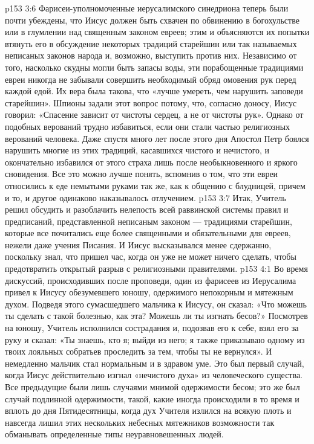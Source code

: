 \vs p153 3:6 Фарисеи\hyp{}уполномоченные иерусалимского синедриона теперь были почти убеждены, что Иисус должен быть схвачен по обвинению в богохульстве или в глумлении над священным законом евреев; этим и объясняются их попытки втянуть его в обсуждение некоторых традиций старейшин или так называемых неписаных законов народа и, возможно, выступить против них. Независимо от того, насколько скудны могли быть запасы воды, эти порабощенные традициями евреи никогда не забывали совершить необходимый обряд омовения рук перед каждой едой. Их вера была такова, что «лучше умереть, чем нарушить заповеди старейшин». Шпионы задали этот вопрос потому, что, согласно доносу, Иисус говорил: «Спасение зависит от чистоты сердец, а не от чистоты рук». Однако от подобных верований трудно избавиться, если они стали частью религиозных верований человека. Даже спустя много лет после этого дня Апостол Петр боялся нарушить многие из этих традиций, касавшихся чистого и нечистого, и окончательно избавился от этого страха лишь после необыкновенного и яркого сновидения. Все это можно лучше понять, вспомнив о том, что эти евреи относились к еде немытыми руками так же, как к общению с блудницей, причем и то, и другое одинаково наказывалось отлучением.
\vs p153 3:7 Итак, Учитель решил обсудить и разоблачить нелепость всей раввинской системы правил и предписаний, представленной неписаным законом --- традициями старейшин, которые все почитались еще более священными и обязательными для евреев, нежели даже учения Писания. И Иисус высказывался менее сдержанно, поскольку знал, что пришел час, когда он уже не может ничего сделать, чтобы предотвратить открытый разрыв с религиозными правителями.
\vs p153 4:1 Во время дискуссий, происходивших после проповеди, один из фарисеев из Иерусалима привел к Иисусу обезумевшего юношу, одержимого непокорным и мятежным духом. Подведя этого сумасшедшего мальчика к Иисусу, он сказал: «Что можешь ты сделать с такой болезнью, как эта? Можешь ли ты изгнать бесов?» Посмотрев на юношу, Учитель исполнился сострадания и, подозвав его к себе, взял его за руку и сказал: «Ты знаешь, кто я; выйди из него; я также приказываю одному из твоих лояльных собратьев проследить за тем, чтобы ты не вернулся». И немедленно мальчик стал нормальным и в здравом уме. Это был первый случай, когда Иисус действительно изгнал «нечистого духа» из человеческого существа. Все предыдущие были лишь случаями мнимой одержимости бесом; это же был случай подлинной одержимости, такой, какие иногда происходили в то время и вплоть до дня Пятидесятницы, когда дух Учителя излился на всякую плоть и навсегда лишил этих нескольких небесных мятежников возможности так обманывать определенные типы неуравновешенных людей.
